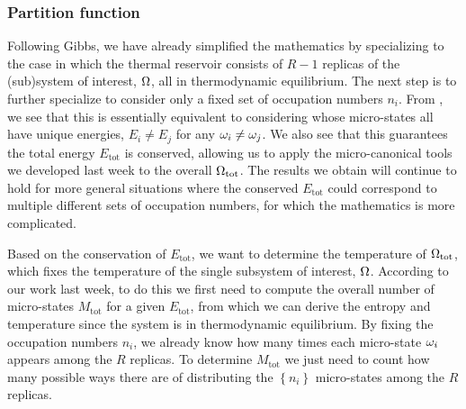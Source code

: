 \subsubsection{Partition function}
Following Gibbs, we have already simplified the mathematics by specializing to the case in which the thermal reservoir consists of $R - 1$ replicas of the (sub)system of interest, $\Omega$, all in thermodynamic equilibrium.
The next step is to further specialize to consider only a fixed set of occupation numbers $n_i$.
From , we see that this is essentially equivalent to considering \Om whose micro-states all have unique energies, $E_i \ne E_j$ for any $\omega_i \ne \omega_j$.
We also see that this guarantees the total energy $E_{\text{tot}}$ is conserved, allowing us to apply the micro-canonical tools we developed last week to the overall $\Omega_{\text{tot}}$.
The results we obtain will continue to hold for more general situations where the conserved $E_{\text{tot}}$ could correspond to multiple different sets of occupation numbers, for which the mathematics is more complicated.

Based on the conservation of $E_{\text{tot}}$, we want to determine the temperature of $\Omega_{\text{tot}}$, which fixes the temperature of the single subsystem of interest, $\Omega$.
According to our work last week, to do this we first need to compute the overall number of micro-states $M_{\text{tot}}$ for a given $E_{\text{tot}}$, from which we can derive the entropy and temperature since the system is in thermodynamic equilibrium.
By fixing the occupation numbers $n_i$, we already know how many times each micro-state $\omega_i$ appears among the $R$ replicas.
To determine $M_{\text{tot}}$ we just need to count how many possible ways there are of distributing the $\left\{n_i\right\}$ micro-states among the $R$ replicas.

